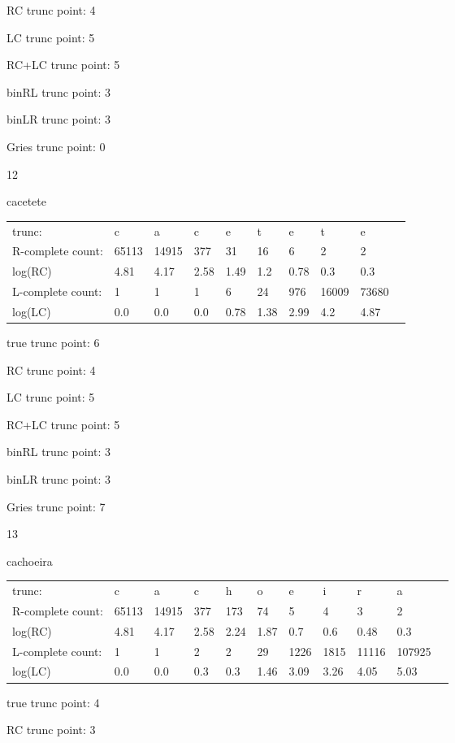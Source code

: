 \documentclass[10pt]{article}
\begin{document}
RC trunc point: 4

LC trunc point: 5

RC+LC trunc point: 5

binRL trunc point: 3

binLR trunc point: 3

Gries trunc point: 0

\vspace{1em}

12

cacetete

\begin{tabular}{l|lllllllll}
trunc: & c & a & c & e & t & e & t & e & \\ 
R-complete count: & 65113 & 14915 & 377 & 31 & 16 & 6 & 2 & 2 & \\ 
log(RC) & 4.81 & 4.17 & 2.58 & 1.49 & 1.2 & 0.78 & 0.3 & 0.3 & \\ 
L-complete count: & 1 & 1 & 1 & 6 & 24 & 976 & 16009 & 73680 & \\ 
log(LC) & 0.0 & 0.0 & 0.0 & 0.78 & 1.38 & 2.99 & 4.2 & 4.87 & \\ 
\end{tabular}

true trunc point: 6

RC trunc point: 4

LC trunc point: 5

RC+LC trunc point: 5

binRL trunc point: 3

binLR trunc point: 3

Gries trunc point: 7

\newpage

13

cachoeira

\begin{tabular}{l|llllllllll}
trunc: & c & a & c & h & o & e & i & r & a & \\ 
R-complete count: & 65113 & 14915 & 377 & 173 & 74 & 5 & 4 & 3 & 2 & \\ 
log(RC) & 4.81 & 4.17 & 2.58 & 2.24 & 1.87 & 0.7 & 0.6 & 0.48 & 0.3 & \\ 
L-complete count: & 1 & 1 & 2 & 2 & 29 & 1226 & 1815 & 11116 & 107925 & \\ 
log(LC) & 0.0 & 0.0 & 0.3 & 0.3 & 1.46 & 3.09 & 3.26 & 4.05 & 5.03 & \\ 
\end{tabular}

true trunc point: 4

RC trunc point: 3
\end{document}
